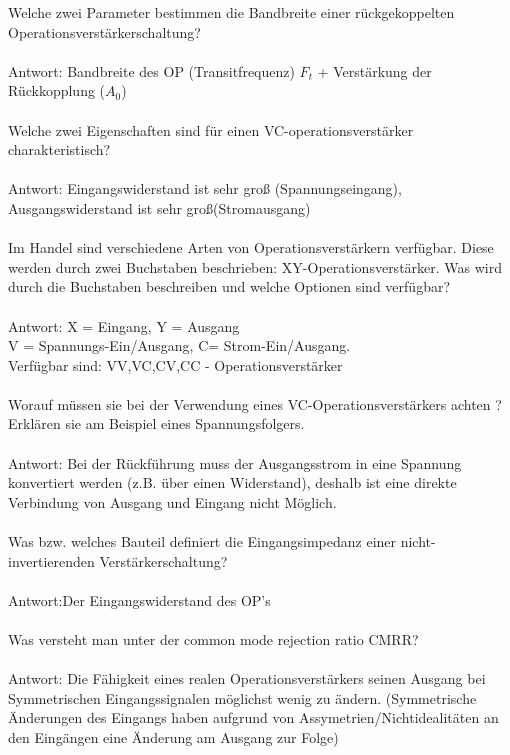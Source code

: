\documentclass[A4]{scrartcl}
\begin{document}
  Welche zwei Parameter bestimmen die Bandbreite einer rückgekoppelten\\ 
  Operationsverstärkerschaltung?\\
  \\
  Antwort: Bandbreite des OP (Transitfrequenz) $F_t$ + Verstärkung der Rückkopplung ($A_0$)\\\\
  Welche zwei Eigenschaften sind für einen VC-operationsverstärker charakteristisch?\\
  \\
  Antwort: Eingangswiderstand ist sehr groß (Spannungseingang), Ausgangswiderstand ist sehr groß(Stromausgang)\\\\
  Im Handel sind verschiedene Arten von Operationsverstärkern verfügbar. Diese werden durch zwei Buchstaben beschrieben: XY-Operationsverstärker. Was wird durch die Buchstaben beschreiben und welche Optionen sind verfügbar?\\
  \\
  Antwort: X = Eingang, Y = Ausgang\\
  V = Spannungs-Ein/Ausgang, C= Strom-Ein/Ausgang.\\
  Verfügbar sind: VV,VC,CV,CC - Operationsverstärker \\\\
  Worauf müssen sie bei der Verwendung eines VC-Operationsverstärkers achten ? Erklären sie am Beispiel eines Spannungsfolgers.\\
  \\
  Antwort: Bei der Rückführung muss der Ausgangsstrom in eine Spannung konvertiert werden (z.B. über einen Widerstand), deshalb ist eine direkte Verbindung von Ausgang und Eingang nicht Möglich.\\\\
  Was bzw. welches Bauteil definiert die Eingangsimpedanz einer nicht-invertierenden Verstärkerschaltung?\\
  \\
  Antwort:Der Eingangswiderstand des OP's\\\\
  Was versteht man unter der common mode rejection ratio CMRR?\\
  \\
  Antwort: Die Fähigkeit eines realen Operationsverstärkers seinen Ausgang bei Symmetrischen Eingangssignalen möglichst wenig zu ändern. 
  (Symmetrische Änderungen des Eingangs haben aufgrund von Assymetrien/Nichtidealitäten an den Eingängen eine Änderung am Ausgang zur Folge)\\
\end{document}
